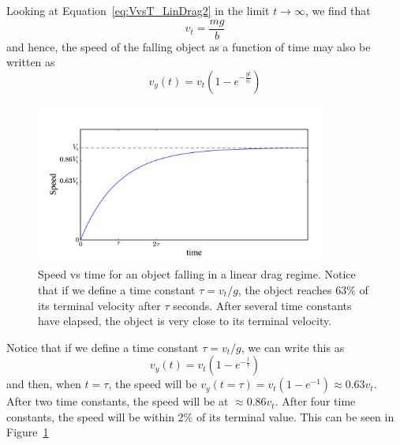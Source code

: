 Looking at Equation~\ref{eq:VvsT_LinDrag2} in the limit $t\rightarrow \infty$, we find that 
\begin{equation}
v_t = \frac{mg}{b}
\label{eq:terminal_v}
\end{equation}
and hence, the speed of the falling object as a function of time may also be written as 
\begin{equation}
v_{y} (t) = v_{t} \left(1-e^{-\frac{gt}{v_{t}}}\right)
\label{eq:VvsT_LinDrag3}
\end{equation}
\begin{figure}[t]
\centering
\includegraphics[width=0.85\textwidth]{Figures/Kinematics/theory.pdf}
\caption{Speed vs time for an object falling in a linear drag regime. Notice that if we define a time constant $\tau = v_t/g$, the object reaches 63\% of its terminal velocity after $\tau$ seconds. After several time constants have elapsed, the object is very close to its terminal velocity.}
\label{fig-LinearDrag}       %
\end{figure}
Notice that if we define a time constant $\tau = v_{t}/g$, we can write this as
\begin{equation}
v_{y} (t) = v_{t} \left(1-e^{-\frac{t}{\tau}}\right)
\label{eq:VvsT_LinDrag4}
\end{equation}
and then, when $t=\tau$, the speed will be $v_{y} (t=\tau) = v_{t} \left(1-e^{-1}\right)\approx 0.63v_t$. After two time constants, the speed will be at $\approx 0.86v_t$. After four time constants, the speed will be within 2\% of its terminal value. This can be seen in Figure~\ref{fig-LinearDrag}

